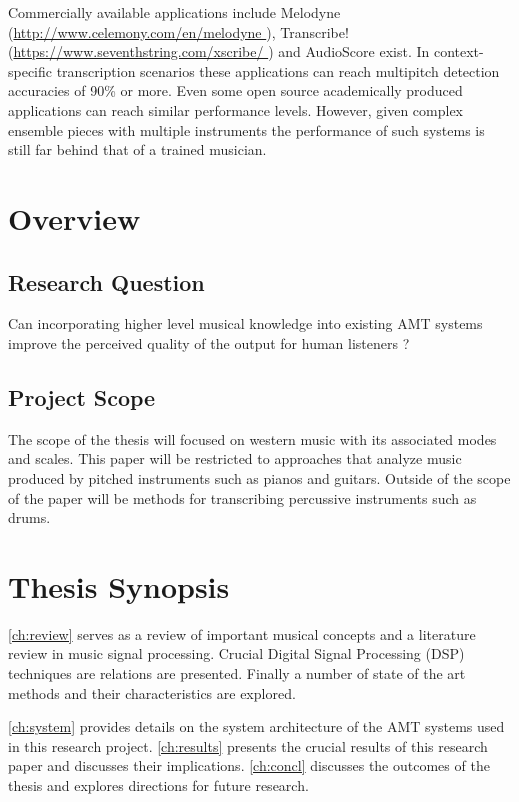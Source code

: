 Commercially available applications include Melodyne (\url{http://www.celemony.com/en/melodyne }), Transcribe!(\url{https://www.seventhstring.com/xscribe/ })  and AudioScore exist.
In context-specific transcription scenarios these applications can reach multipitch detection accuracies of 90\% or more. Even some open source
academically produced applications can reach similar performance levels. \cite{context-dependent2016:Cogliati}
However, given complex ensemble pieces with multiple instruments the performance of such systems
is still far behind that of a trained musician.

\section{Overview}

\subsection{Research Question}

Can incorporating higher level musical knowledge into existing AMT systems
improve the perceived quality of the output for human listeners ?

\subsection{Project Scope}

The scope of the thesis will focused on western music with its associated modes
and scales. This paper will be restricted to approaches that analyze music
produced by pitched instruments such as pianos and guitars. Outside of the scope
of the paper will be methods for transcribing percussive instruments such as
drums.

\section{Thesis Synopsis}

\autoref{ch:review} serves as a review of important musical concepts and a
literature review in music signal processing. Crucial Digital Signal Processing
(DSP) techniques are relations are presented. Finally a number of state of the
art methods and their characteristics are explored.

\autoref{ch:system} provides details on the system architecture of the AMT
systems used in this research project. \autoref{ch:results} presents the crucial
results of this research paper and discusses their implications.
\autoref{ch:concl} discusses the outcomes of the thesis and explores directions
for future research.

